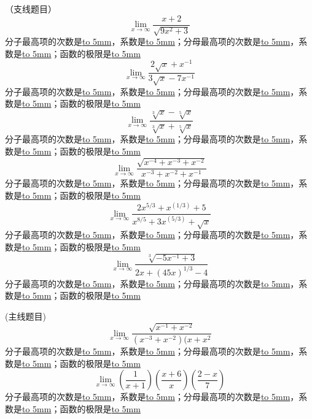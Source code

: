 \documentclass[UTF8]{ctexart}
\begin{document}
（支线题目）
\[{\lim_{x \to \infty} \frac{x+2}{\sqrt{9x^2+3}}} \]
分子最高项的次数是\underline{\hbox to 5mm{}}，系数是\underline{\hbox to 5mm{}}；分母最高项的次数是\underline{\hbox to 5mm{}}，系数是\underline{\hbox to 5mm{}}；函数的极限是\underline{\hbox to 5mm{}}
\[{\lim_{x \to \infty} \frac{2\sqrt{x}+x^{-1}}{3\sqrt{x} - 7x^{-1}}}\]
分子最高项的次数是\underline{\hbox to 5mm{}}，系数是\underline{\hbox to 5mm{}}；分母最高项的次数是\underline{\hbox to 5mm{}}，系数是\underline{\hbox to 5mm{}}；函数的极限是\underline{\hbox to 5mm{}}
\[{\lim_{x \to \infty} \frac{\sqrt[3]{x}-\sqrt[5]{x}}{\sqrt[3]{x}+\sqrt[5]{x}}}\]
分子最高项的次数是\underline{\hbox to 5mm{}}，系数是\underline{\hbox to 5mm{}}；分母最高项的次数是\underline{\hbox to 5mm{}}，系数是\underline{\hbox to 5mm{}}；函数的极限是\underline{\hbox to 5mm{}}
\[{\lim_{x \to \infty} \frac{\sqrt{x^{-4}+x^{-3}+x^{-2}}}{x^{-3}+x^{-2}+x^{-1}}}\]
分子最高项的次数是\underline{\hbox to 5mm{}}，系数是\underline{\hbox to 5mm{}}；分母最高项的次数是\underline{\hbox to 5mm{}}，系数是\underline{\hbox to 5mm{}}；函数的极限是\underline{\hbox to 5mm{}}
\[{\lim_{x \to \infty} \frac{2x^{5/3} + x^(1/3) +5}{x^{8/5} + 3x^(5/3) + \sqrt{x}}}\]
分子最高项的次数是\underline{\hbox to 5mm{}}，系数是\underline{\hbox to 5mm{}}；分母最高项的次数是\underline{\hbox to 5mm{}}，系数是\underline{\hbox to 5mm{}}；函数的极限是\underline{\hbox to 5mm{}}
\[{\lim_{x \to \infty} \frac{\sqrt[3]{-5x^{-1}+3}}{2x+(45x)^{1/3} -4}}\]
分子最高项的次数是\underline{\hbox to 5mm{}}，系数是\underline{\hbox to 5mm{}}；分母最高项的次数是\underline{\hbox to 5mm{}}，系数是\underline{\hbox to 5mm{}}；函数的极限是\underline{\hbox to 5mm{}}

(主线题目)
\[{\lim_{x \to \infty} \frac{\sqrt{x^{-1}+x^{-2}}}{(x^{-3}+x^{-2})(x+x^2}}\]
分子最高项的次数是\underline{\hbox to 5mm{}}，系数是\underline{\hbox to 5mm{}}；分母最高项的次数是\underline{\hbox to 5mm{}}，系数是\underline{\hbox to 5mm{}}；函数的极限是\underline{\hbox to 5mm{}}
\[{\lim_{x \to \infty} (\frac{1}{x+1})(\frac{x+6}{x})(\frac{2-x}{7}) }\]
分子最高项的次数是\underline{\hbox to 5mm{}}，系数是\underline{\hbox to 5mm{}}；分母最高项的次数是\underline{\hbox to 5mm{}}，系数是\underline{\hbox to 5mm{}}；函数的极限是\underline{\hbox to 5mm{}}
\end{document}
